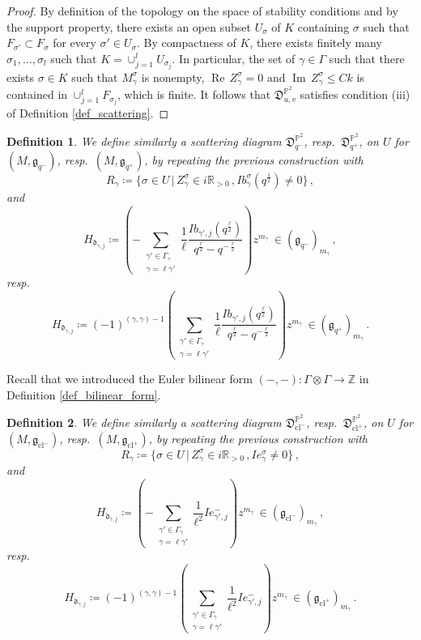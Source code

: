 \documentclass[12pt, a4paper]{amsart}
\newtheorem{defn}{Definition}[section]
\newcommand\PP{\mathbb P}
\newcommand\R{\mathbb R}
\newcommand\Z{\mathbb Z}
\newcommand\fd{\mathfrak d}
\newcommand\fD{\mathfrak D}
\newcommand\fg{\mathfrak g}
\newcommand\Rea{\operatorname{Re}\,}
\newcommand\Ima{\operatorname{Im}\,}
\newcommand\cl{\operatorname{cl}}
\begin{document}
\begin{proof}
By definition of the topology on the space of stability conditions and by the support property, there exists an open subset $U_\sigma$ of $K$ containing $\sigma$ such that $F_{\sigma'}\subset F_{\sigma}$ for every $\sigma' \in U_\sigma$.
By compactness of $K$, there exists finitely many $\sigma_1, \dots,\sigma_l$ such that $K=\cup_{j=1}^l U_{\sigma_j}$. In particular, the set of $\gamma \in \Gamma$  such that there exists $\sigma \in K$ such that
$M_\gamma^\sigma$ is nonempty,
$\Rea Z_{\gamma}^\sigma=0$ and $\Ima Z_{\gamma}^\sigma \leqslant Ck$
is contained in $\cup_{j=1}^l F_{\sigma_j}$, which is finite. It follows that $\fD^{\PP^2}_{u,v}$ satisfies condition (iii) 
of Definition \ref{def_scattering}.
\end{proof}

\begin{defn} \label{def_scattering_stability_q}
We define similarly a scattering diagram $\fD_{q^-}^{\PP^2}$, resp.\
$\fD_{q^+}^{\PP^2}$,
on $U$ for $(M, \fg_{q^-})$, resp.\
$(M, \fg_{q^+})$,
by repeating the previous construction with 
\[R_\gamma \coloneqq \{ \sigma \in U\,| \, Z_\gamma^{\sigma} \in i \R_{>0} \,,
Ib_\gamma^\sigma(q^{\frac{1}{2}}) \neq 0 \}\,, \]
and 
\[H_{\fd_{\gamma,j}}
\coloneq
\left(
-\sum_{\substack{\gamma' \in \Gamma_\gamma
\\ \gamma = \ell \gamma'}}
\frac{1}{\ell}
\frac{Ib_{\gamma',j}(q^{\frac{\ell}{2}})}{
q^{\frac{\ell}{2}}-q^{-\frac{\ell}{2}}}
\right) 
z^{m_\gamma} \,\in (\fg_{q^-})_{m_\gamma}\,,\]
resp.\
\[H_{\fd_{\gamma,j}}
\coloneq
(-1)^{(\gamma,\gamma)-1}
\left(
\sum_{\substack{\gamma' \in \Gamma_\gamma
\\ \gamma = \ell \gamma'}}
\frac{1}{\ell}
\frac{Ib_{\gamma',j}(q^{\frac{\ell}{2}})}{
q^{\frac{\ell}{2}}-q^{-\frac{\ell}{2}}}
\right) 
z^{m_\gamma} \,\in (\fg_{q^+})_{m_\gamma}\,.\] 
\end{defn}

Recall that we introduced the Euler bilinear form $(-,-)\colon \Gamma \otimes 
\Gamma \rightarrow \Z$ in Definition 
\ref{def_bilinear_form}.

\begin{defn}\label{def_scattering_stability_cl}
We define similarly a scattering diagram $\fD_{\cl^-}^{\PP^2}$, 
resp.\ $\fD_{\cl^+}^{\PP^2}$,
on $U$ for $(M, \fg_{\cl^-})$, resp.\ 
$(M, \fg_{\cl^+})$,
by repeating the previous construction with 
\[R_\gamma \coloneqq \{ \sigma \in U \,| \, Z_\gamma^{\sigma} \in i \R_{>0} \,,
Ie_\gamma^\sigma \neq 0 \}\,, \]
and 
\[H_{\fd_{\gamma,j}}\coloneq
\left(
-\sum_{\substack{\gamma' \in \Gamma_\gamma \\ \gamma=\ell \gamma'}}
\frac{1}{\ell^2}
Ie_{\gamma',j}^-
\right)
z^{m_\gamma}
\,\in (\fg_{\cl^-})_{m_\gamma}\,,\]
resp.\
\[H_{\fd_{\gamma,j}}\coloneq
(-1)^{(\gamma,\gamma)-1}
\left(
\sum_{\substack{\gamma' \in \Gamma_\gamma \\ \gamma=\ell \gamma'}}
\frac{1}{\ell^2}Ie^-_{\gamma',j}
\right)
z^{m_\gamma}
\,\in (\fg_{\cl^+})_{m_\gamma}\,.\]
\end{defn}
\end{document}
